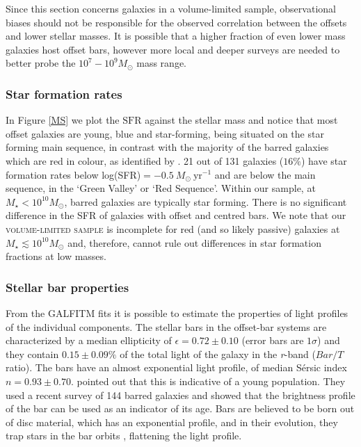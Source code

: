 \documentclass[a4paper,fleqn,usenatbib,useAMS]{mnras}
\begin{document}
Since this section concerns galaxies in a volume-limited sample, observational biases should not be responsible for the observed correlation between the offsets and lower stellar masses. It is possible that a higher fraction of even lower mass galaxies host offset bars, however more local and deeper surveys are needed to better probe the $10^{7}-10^{9} M_{\odot}$ mass range.
 

\subsubsection{Star formation rates}

In Figure \ref{MS} we plot the $\mathrm{SFR}$ \citep{Brinchmann2004} against the stellar mass and notice that most offset galaxies are young, blue and star-forming, being situated on the star forming main sequence, in contrast with the majority of the barred galaxies which are red in colour, as identified by \citet{Masters2011}. 21 out of 131 galaxies ($16\%$) have star formation rates below log(SFR)$=-0.5\:M_{\odot}\:\mathrm{yr}^{-1}$ and are below the main sequence, in the `Green Valley' or `Red Sequence'. Within our sample, at $M_{\star}<10^{10} M_{\odot}$, barred galaxies are typically star forming. There is no significant difference in the SFR of galaxies with offset and centred bars. We note that our \textsc{volume-limited sample} is incomplete for red (and so likely passive) galaxies at $M_{\star}\lesssim10^{10} M_{\odot}$ and, therefore, cannot rule out differences in star formation fractions at low masses.

\subsubsection{Stellar bar properties}

From the GALFITM fits it is possible to estimate the properties of light profiles of the individual components. The stellar bars in the offset-bar systems are characterized by a median ellipticity of $\epsilon=0.72 \pm 0.10$ (error bars are $1\sigma$) and they contain $0.15\pm0.09\%$ of the total light of the galaxy in the \textit{r}-band ($Bar/T$ ratio). The bars have an almost exponential light profile, of median S\'ersic index $n=0.93\pm0.70$. \citet{Kim2015} pointed out that this is indicative of a young population. They used a recent survey of 144 barred galaxies and showed that the brightness profile of the bar can be used as an indicator of its age. Bars are believed to be born out of disc material, which has an exponential profile, and in their evolution, they trap stars in the bar orbits \citep{Sellwood1993, Sellwood2014, Athanassoula2013}, flattening the light profile. 
\end{document}
